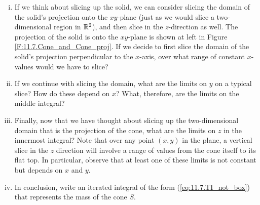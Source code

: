 \begin{activity}
	\begin{enumerate}[i.]
	\item If we think about slicing up the solid, we can consider slicing the domain of the solid's projection onto the $xy$-plane (just as we would slice a two-dimensional region in $\mathbb{R}^2$), and then slice in the $z$-direction as well. The projection of the solid is onto the $xy$-plane is shown at left in Figure \ref{F:11.7.Cone_and_Cone_proj}. If we decide to first slice the domain of the solid's projection perpendicular to the $x$-axis, over what range of constant $x$-values would we have to slice?  

    \item If we continue with slicing the domain, what are the limits on $y$ on a typical slice?  How do these depend on $x$?   What, therefore, are the limits on the middle integral? 
    
    \item Finally, now that we have thought about slicing up the two-dimensional domain that is the projection of the cone, what are the limits on $z$ in the innermost integral? Note that over any point $(x,y)$ in the plane, a vertical slice in the $z$ direction will involve a range of values from the cone itself to its flat top.  In particular, observe that at least one of these limits is not constant but depends on $x$ and $y$.

    \item In conclusion, write an iterated integral of the form (\ref{eq:11.7.TI_not_box}) that represents the mass of the cone $S$.

	\end{enumerate}

    \ea

\end{activity}


